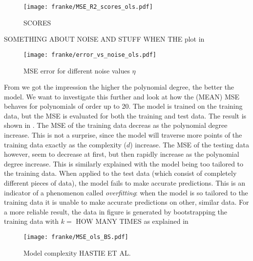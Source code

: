             \begin{figure}
                \texttt{[image: franke/MSE\_R2\_scores\_ols.pdf]}
                \caption{SCORES}
                \label{fig:mse_and_r2_for_order5}
            \end{figure}
            
            
            SOMETHING ABOUT NOISE AND STUFF WHEN THE plot in 

            \begin{figure}
                \texttt{[image: franke/error\_vs\_noise\_ols.pdf]}
                \caption{MSE error for different noise values $\eta$}
                \label{fig:mse_for_different_noise_ols}
            \end{figure}


            From  we got the impression the higher the polynomial degree, the better the model. We want to investigate this further and look at how the (MEAN) MSE behaves for polynomials of order up to 20. The model is trained on the training data, but the MSE is evaluated for both the training and test data. The result is shown in . The MSE of the training data decreas as the polynomial degree increase. This is not a surprise, since the model will traverse more points of the training data exactly as the complexity ($d$) increase. The MSE of the testing data however, seem to decrease at first, but then rapidly increase as the polynomial degree increase. This is similarly explained with the model being too tailored to the training data. When applied to the test data (which consist of completely different pieces of data), the model fails to make accurate predictions. This is an indicator of a phenomenon called \textit{overfitting}: when the model is so tailored to the training data it is unable to make accurate predictions on other, similar data. For a more reliable result, the data in figure  is generated by bootstrapping the training data with $k=$ HOW MANY TIMES as explained in 

            \begin{figure}
                \texttt{[image: franke/MSE\_ols\_BS.pdf]}
                \caption{Model complexity HASTIE ET AL.}
                \label{fig:model_complexity_ols}
            \end{figure}


